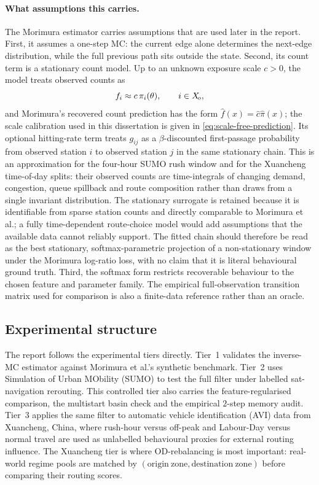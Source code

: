 \paragraph{What assumptions this carries.}
The Morimura estimator carries assumptions that are used later in the
report. First, it assumes a one-step MC: the current edge alone determines
the next-edge distribution, while the full previous path sits outside the
state. Second, its count term is a stationary count model. Up to an
unknown exposure scale $c>0$, the model
treats observed counts as
\[
f_i \approx c\,\pi_i(\theta), \qquad i\in X_{\!o},
\]
and Morimura's recovered count prediction has the form
$\hat{f}(x)=\hat{c}\hat{\pi}(x)$; the scale calibration used in this
dissertation is given in \cref{eq:scale-free-prediction}. Its optional
hitting-rate term treats $g_{ij}$ as a $\beta$-discounted first-passage
probability from observed station $i$ to observed station $j$ in the same
stationary chain. This is an approximation for the four-hour SUMO rush
window and for the Xuancheng time-of-day splits: their observed counts
are time-integrals of changing demand, congestion, queue spillback and
route composition rather than draws from a single invariant distribution.
The stationary surrogate is retained because it is identifiable from
sparse station counts and directly comparable to Morimura et al.; a fully
time-dependent route-choice model would add assumptions that the available
data cannot reliably support. The fitted chain should therefore be read as
the best stationary, softmax-parametric projection of a
non-stationary window under the Morimura log-ratio loss, with no claim
that it is literal behavioural ground truth. Third, the softmax form restricts recoverable
behaviour to the chosen feature and parameter family. The empirical
full-observation transition matrix used for comparison is also a
finite-data reference rather than an oracle.

\subsection{Experimental structure}
\label{sec:roadmap}\label{sec:sumo}\label{sec:avi-prior}

The report follows the experimental tiers directly. Tier~1 validates the
inverse-MC estimator against Morimura et al.'s synthetic benchmark.
Tier~2 uses Simulation of Urban MObility (SUMO) \cite{lopez2018} to test
the full filter under labelled sat-navigation rerouting. This controlled
tier also carries the feature-regularised comparison\label{sec:features},
the multistart basin check and the empirical $2$-step memory
audit\label{sec:2step-diag}. Tier~3 applies the same filter to automatic
vehicle identification (AVI) data from Xuancheng, China, where rush-hour
versus off-peak and Labour-Day versus normal travel are used as
unlabelled behavioural proxies for external routing influence. The
Xuancheng tier is where OD-rebalancing\label{sec:od-rebal} is most
important: real-world regime pools are matched by
$(\mathrm{origin\ zone},\mathrm{destination\ zone})$ before comparing
their routing scores.

